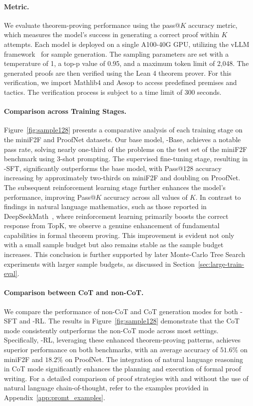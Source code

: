 \paragraph{Metric.}
We evaluate theorem-proving performance using the pass@$K$ accuracy metric, which measures the model's success in generating a correct proof within $K$ attempts. Each model is deployed on a single A100-40G GPU, utilizing the vLLM framework~\citep{kwon2023efficient} for sample generation. The sampling parameters are set with a temperature of 1, a top-p value of 0.95, and a maximum token limit of 2,048. The generated proofs are then verified using the Lean 4 theorem prover. For this verification, we import Mathlib4 \citep{mathlib} and Aesop \citep{limperg2023aesop} to access predefined premises and tactics. The verification process is subject to a time limit of 300 seconds.

\paragraph{Comparison across Training Stages.}
Figure~\ref{fig:sample128} presents a comparative analysis of each training stage on the miniF2F and ProofNet datasets. Our base model, \thiswork-Base, achieves a notable pass rate, solving nearly one-third of the problems on the test set of the miniF2F benchmark using 3-shot prompting. The supervised fine-tuning stage, resulting in \thiswork-SFT, significantly outperforms the base model, with Pass@128 accuracy increasing by approximately two-thirds on miniF2F and doubling on ProofNet. The subsequent reinforcement learning stage further enhances the model's performance, improving Pass@$K$ accuracy across all values of $K$. In contrast to findings in natural language mathematics, such as those reported in DeepSeekMath~\citep{shao2024deepseekmath}, where reinforcement learning primarily boosts the correct response from TopK, we observe a genuine enhancement of fundamental capabilities in formal theorem proving. This improvement is evident not only with a small sample budget but also remains stable as the sample budget increases. This conclusion is further supported by later Monte-Carlo Tree Search experiments with larger sample budgets, as discussed in Section~\ref{sec:large-train-eval}.

\paragraph{Comparison between CoT and non-CoT.}
We compare the performance of non-CoT and CoT generation modes for both \thiswork-SFT and \thiswork-RL. The results in Figure~\ref{fig:sample128} demonstrate that the CoT mode consistently outperforms the non-CoT mode across most settings. Specifically, \thiswork-RL, leveraging these enhanced theorem-proving patterns, achieves superior performance on both benchmarks, with an average accuracy of $51.6\%$ on miniF2F and $18.2\%$ on ProofNet. The integration of natural language reasoning in CoT mode significantly enhances the planning and execution of formal proof writing. For a detailed comparison of proof strategies with and without the use of natural language chain-of-thought, refer to the examples provided in Appendix~\ref{app:promt_examples}.
